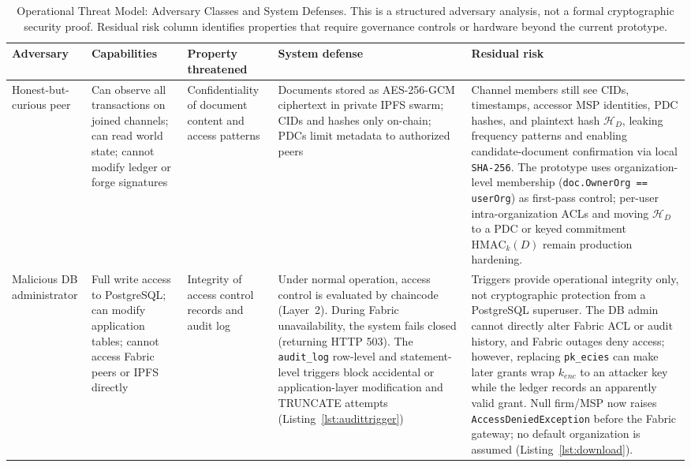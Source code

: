 \documentclass{ieeeaccess}
\begin{document}
\begin{table}[!t]
\centering
\caption{Operational Threat Model: Adversary Classes and System
Defenses. This is a structured adversary analysis, not a formal
cryptographic security proof. Residual risk column identifies
properties that require governance controls or hardware beyond
the current prototype.}
\label{tab:threat_model}
\renewcommand{\arraystretch}{1.15}
\scriptsize
\begin{tabularx}{\textwidth}{|p{2.2cm}|X|p{2.0cm}|X|X|}
\hline
\textbf{Adversary} & \textbf{Capabilities} &
\textbf{Property threatened} &
\textbf{System defense} & \textbf{Residual risk} \\
\hline
Honest-but-curious peer &
Can observe all transactions on joined channels; can read world state;
cannot modify ledger or forge signatures &
Confidentiality of document content and access patterns &
Documents stored as AES-256-GCM ciphertext in private IPFS swarm;
CIDs and hashes only on-chain; PDCs limit metadata to authorized
peers~\cite{fabricPDCDoc} &
Channel members still see CIDs, timestamps, accessor MSP identities,
PDC hashes, and plaintext hash \(\mathcal{H}_D\), leaking frequency
patterns and enabling candidate-document confirmation via local
\texttt{SHA-256}. The prototype uses organization-level membership
(\texttt{doc.OwnerOrg == userOrg}) as first-pass control; per-user
intra-organization ACLs and moving \(\mathcal{H}_D\) to a PDC or keyed
commitment \(\text{HMAC}_k(D)\) remain production hardening. \\
\hline
Malicious DB administrator &
Full write access to PostgreSQL; can modify application tables;
cannot access Fabric peers or IPFS directly &
Integrity of access control records and audit log &
Under normal operation, access control is evaluated by chaincode
(Layer~2). During Fabric unavailability, the system fails closed 
(returning HTTP 503). The \texttt{audit\_log} row-level
and statement-level triggers block accidental or application-layer
modification and TRUNCATE attempts (Listing~\ref{lst:audittrigger}) &
Triggers provide operational integrity only, not cryptographic
protection from a PostgreSQL superuser. The DB admin cannot directly
alter Fabric ACL or audit history, and Fabric outages deny access;
however, replacing \texttt{pk\_ecies} can make later grants wrap
$k_{enc}$ to an attacker key while the ledger records an apparently
valid grant. Null firm/MSP now raises \texttt{AccessDeniedException}
before the Fabric gateway; no default organization is assumed
(Listing~\ref{lst:download}). \\

\end{tabularx}
\end{table}
\end{document}
